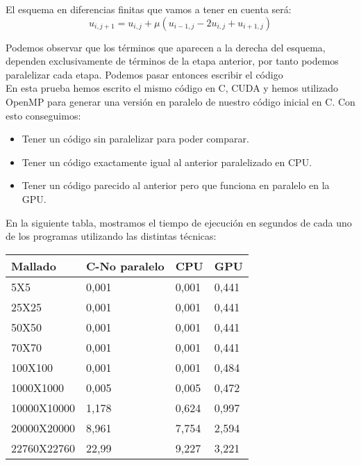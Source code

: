 \begin{ejemplo}
	El esquema en diferencias finitas que vamos a tener en cuenta será:
	\[
		u_{i, j+1} = u_{i, j} + \mu (u_{i-1, j} - 2 u_{i, j} + u_{i+1, j})
	\]
	
	Podemos observar que los términos que aparecen a la derecha del esquema, dependen exclusivamente de términos de la etapa anterior, por tanto podemos paralelizar cada etapa. Podemos pasar entonces escribir el código\\
	
	En esta prueba hemos escrito el mismo código en C, CUDA y hemos utilizado OpenMP para generar una versión en paralelo de nuestro código inicial en C. Con esto conseguimos:
	\begin{itemize}
		\item Tener un código sin paralelizar para poder comparar.
		\item Tener un código exactamente igual al anterior paralelizado en CPU.
		\item Tener un código parecido al anterior pero que funciona en paralelo en la GPU.
	\end{itemize}

	En la siguiente tabla, mostramos el tiempo de ejecución en segundos de cada uno de los programas utilizando las distintas técnicas:
	
	\begin{table}[h]
		\centering
		\begin{tabular}{@{}llll@{}}
			\toprule
			Mallado     & C-No paralelo & CPU   & GPU   \\ \midrule
			5X5         & 0,001         & 0,001 & 0,441 \\
			25X25       & 0,001         & 0,001 & 0,441 \\
			50X50       & 0,001         & 0,001 & 0,441 \\
			70X70       & 0,001         & 0,001 & 0,441 \\
			100X100     & 0,001         & 0,001 & 0,484 \\
			1000X1000   & 0,005         & 0,005 & 0,472 \\
			10000X10000 & 1,178         & 0,624 & 0,997 \\
			20000X20000 & 8,961         & 7,754 & 2,594 \\
			22760X22760 & 22,99         & 9,227 & 3,221 \\ \bottomrule
		\end{tabular}
	\end{table}


\end{ejemplo}
